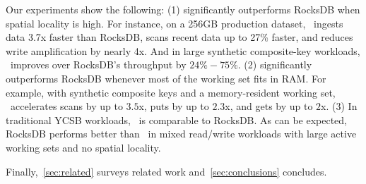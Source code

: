 Our experiments show the following: (1) \sys\/ significantly outperforms RocksDB when spatial  locality is high.  
For instance, on a 256GB production dataset, \sys\ ingests data 3.7x faster than RocksDB,  scans recent  data up to 27\% faster, 
and reduces write amplification by nearly 4x. 
And in large synthetic composite-key workloads, \sys\  improves over RocksDB's throughput by $24\% - 75\%$. 
(2) \sys\/ significantly outperforms RocksDB whenever most of the working set fits in RAM. 
For example, with synthetic composite keys and a memory-resident 
working set, \sys\  accelerates scans by up to $3.5$x, puts by up to $2.3$x, and gets by up to $2$x. 
(3) In traditional YCSB workloads,  \sys\ is comparable to RocksDB. As can be expected, RocksDB performs better than 
\sys\ in mixed read/write workloads with large active working sets and no spatial locality. 


Finally,~\cref{sec:related}  surveys related work and~\cref{sec:conclusions} concludes. 
